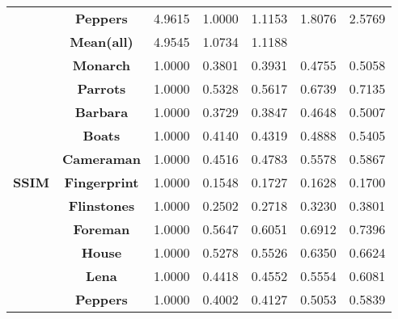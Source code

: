 \documentclass[review]{elsarticle}
\begin{document}
\begin{table}[h!]
\begin{tabular}{|c|cccccc|}
		& \textbf{Peppers}        & 4.9615           & 1.0000                       & {1.1153} & {\color[HTML]{0000FF} 1.8076} & {\color[HTML]{CC0000} 2.5769} \\
		& \cellcolor[HTML]{BCCCFF}\textbf{Mean(all)} & \cellcolor[HTML]{BCCCFF}4.9545  & \cellcolor[HTML]{BCCCFF}1.0734  & \cellcolor[HTML]{BCCCFF}1.1188 & \cellcolor[HTML]{BCCCFF}{\color[HTML]{0000FF} 1.8496} & \cellcolor[HTML]{BCCCFF}{\color[HTML]{CC0000} 2.6328} \\
		\hline
\multirow{12}{0.8cm}{\textbf{SSIM}} & \textbf{Monarch}          & 1.0000           & 0.3801                       & {0.3931} & {\color[HTML]{0000FF} 0.4755} & {\color[HTML]{CC0000} 0.5058} \\
		& \textbf{Parrots}        & 1.0000           & 0.5328                       & {0.5617} & {\color[HTML]{0000FF} 0.6739} & {\color[HTML]{CC0000} 0.7135} \\
		& \textbf{Barbara}        & 1.0000           & 0.3729                       & {0.3847} & {\color[HTML]{0000FF} 0.4648} & {\color[HTML]{CC0000} 0.5007} \\
		& \textbf{Boats}          & 1.0000           & 0.4140                       & {0.4319} & {\color[HTML]{0000FF} 0.4888} & {\color[HTML]{CC0000} 0.5405 }  \\
		& \textbf{Cameraman}      & 1.0000           & 0.4516                       & {0.4783} & {\color[HTML]{0000FF} 0.5578} & {\color[HTML]{CC0000} 0.5867} \\
		& \textbf{Fingerprint}    & 1.0000           & 0.1548                       & {\color[HTML]{CC0000} 0.1727} & {0.1628} & {\color[HTML]{0000FF}0.1700} \\
		& \textbf{Flinstones}     & 1.0000           & 0.2502                       & {0.2718} & {\color[HTML]{0000FF} 0.3230} & {\color[HTML]{CC0000} 0.3801} \\
		& \textbf{Foreman}        & 1.0000           & 0.5647                       & {0.6051} & {\color[HTML]{0000FF} 0.6912} & {\color[HTML]{CC0000} 0.7396} \\
		& \textbf{House}          & 1.0000           & 0.5278                       & {0.5526} & {\color[HTML]{0000FF} 0.6350} & {\color[HTML]{CC0000} 0.6624} \\
		& \textbf{Lena}           & 1.0000           & 0.4418                       & {0.4552} & {\color[HTML]{0000FF} 0.5554} & {\color[HTML]{CC0000} 0.6081} \\
		& \textbf{Peppers}        & 1.0000           & 0.4002                       & {0.4127} & {\color[HTML]{0000FF} 0.5053} & {\color[HTML]{CC0000} 0.5839} \\

\end{tabular}
\end{table}
\end{document}
